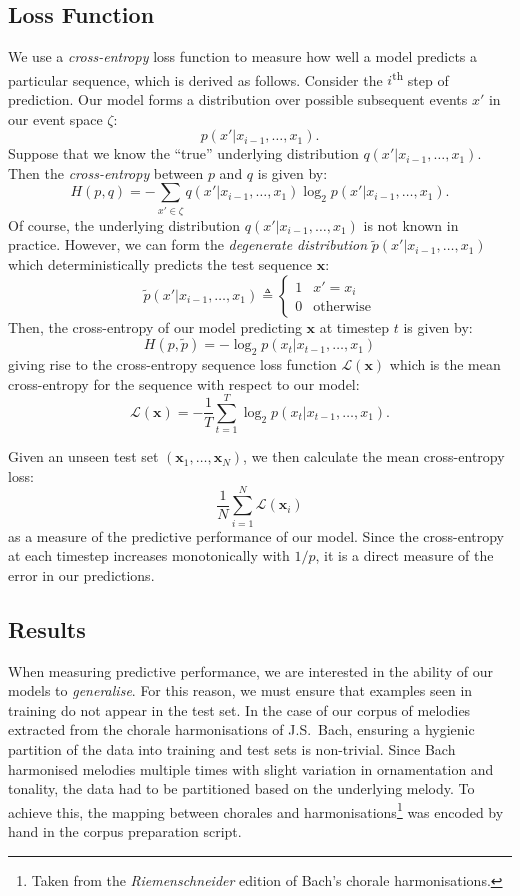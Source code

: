 \documentclass[12pt,a4paper,twoside,openright]{report}
\newcommand{\vect}[1]{\boldsymbol{\mathbf{#1}}}
\begin{document}
\subsection{Loss Function}

We use a \emph{cross-entropy} loss function to measure how well a model predicts
a particular sequence, which is derived as follows.  Consider the
$i$\textsuperscript{th} step of prediction. Our model forms a distribution over
possible subsequent events $x'$ in our event space $\zeta$:
$$ p(x' | x_{i-1}, \ldots, x_1). $$
Suppose that we know the ``true'' underlying distribution $q(x' |
x_{i-1}, \ldots, x_1)$. Then the \emph{cross-entropy} between $p$ and
$q$ is given by:
$$ H(p,q) = - \sum_{x' \in \zeta} q(x' | x_{i-1}, \ldots, x_1) \log_2{ p(x' |
x_{i-1}, \ldots, x_1)}. $$
Of course, the underlying distribution $q(x' | x_{i-1}, \ldots, x_1)$ is not
known in practice. However, we can form the \emph{degenerate distribution}
$\widetilde{p}(x' | x_{i-1}, \ldots, x_1)$ which deterministically predicts the
test sequence $\vect{x}$:
$$ \widetilde{p}(x' | x_{i-1}, \ldots, x_1) \triangleq \begin{cases}
  1 & x' = x_i \\
  0 & \text{otherwise}
\end{cases} $$
Then, the cross-entropy of our model predicting $\vect{x}$ at timestep $t$ is
given by: 
$$ H(p,\widetilde{p}) = - \log_2{ p(x_t | x_{t-1}, \ldots, x_1) } $$
giving rise to the cross-entropy sequence loss function
$\mathcal{L}(\vect{x})$
which is the mean cross-entropy for the sequence with respect to our model:
$$ \mathcal{L}(\vect{x}) = - \frac{1}{T} \sum_{t = 1}^T \log_2{ p(x_t | x_{t-1},
\ldots, x_1) }. $$

Given an unseen test set $(\vect{x}_1,\ldots,\vect{x}_N)$, we then calculate the
mean cross-entropy loss:
$$ \frac{1}{N}\sum_{i = 1}^N \mathcal{L}(\vect{x}_i) $$
as a measure of the predictive performance of our model. Since the cross-entropy
at each timestep increases monotonically with $1/p$, it is a direct measure of
the error in our predictions. 

\subsection{Results}

When measuring predictive performance, we are interested in the ability of our
models to \emph{generalise}. For this reason, we must ensure that examples seen
in training do not appear in the test set. In the case of our corpus of melodies
extracted from the chorale harmonisations of J.S.\ Bach, ensuring a hygienic
partition of the data into training and test sets is non-trivial. Since Bach
harmonised melodies multiple times with slight variation in ornamentation and
tonality, the data had to be partitioned based on the underlying melody. To
achieve this, the mapping between chorales and harmonisations\footnote{Taken
from the \emph{Riemenschneider} edition of Bach's chorale harmonisations.} was
encoded by hand in the corpus preparation script.
\end{document}
